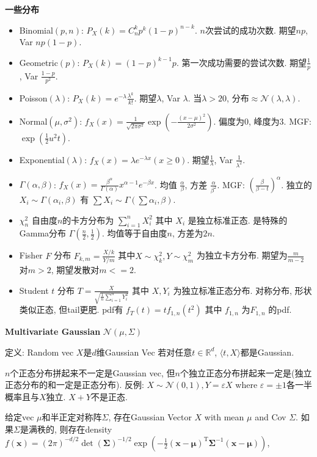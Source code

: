 \documentclass[UTF8]{ctexart}
\begin{document}
\noindent \textbf{一些分布}
\begin{itemize}
\item Binomial$(p, n)$: $P_X(k)=C_n^k p^k (1-p)^{n-k}$. $n$次尝试的成功次数. 期望$np$, Var $np(1-p)$.
\item Geometric$(p)$: $P_X(k)=(1-p)^{k-1}p$. 第一次成功需要的尝试次数. 期望$\frac{1}{p}$, Var $\frac{1-p}{p^2}$.
\item Poisson$(\lambda)$: $P_X(k)=e^{-\lambda}\frac{\lambda^k}{k!}$. 期望$\lambda$, Var $\lambda$.
	当$\lambda >20$, 分布$\approx\mathcal{N}(\lambda, \lambda)$.
\item Normal$(\mu, \sigma^2)$: $f_X(x)=\frac{1}{\sqrt{2\pi\sigma^2}}\exp(-\frac{(x-\mu)^2}{2\sigma^2})$. 
	偏度为0, 峰度为3. MGF: $\exp (\frac12 u^2 t)$.
\item Exponential$(\lambda)$: $f_X(x) = \lambda e^{-\lambda x}(x\geq 0)$. 期望$\frac{1}{\lambda}$, Var $\frac{1}{\lambda^2}$.
\item $\Gamma(\alpha, \beta)$: $f_X(x)=\frac{\beta^{\alpha}}{\Gamma(\alpha)}x^{\alpha-1}e^{-\beta x}$.
	均值 $\frac{\alpha}{\beta}$, 方差 $\frac{\alpha}{\beta^2}$. MGF: $(\frac{\beta}{\beta -t})^{\alpha}$.
	独立的 $X_i\sim \Gamma(\alpha_i,\beta)$ 有 $\sum  X_i \sim \Gamma(\sum \alpha_i, \beta)$.
\item $\chi_n^2$ 自由度$n$的卡方分布为 $\sum_{i=1}^n X_i^2$ 其中 $X_i$ 是独立标准正态. 是特殊的Gamma分布 $\Gamma(\frac{n}{2}, \frac12)$. 
	均值等于自由度$n$, 方差为$2n$.
\item Fisher $F$ 分布 $F_{k,m} = \frac{X/k}{Y/m}$ 其中$X\sim\chi_k^2, Y\sim\chi_m^2$ 为独立卡方分布.
	期望为$\frac{m}{m-2}$对$m>2$, 期望发散对$m<=2$.
\item Student $t$ 分布 $T = \frac{X}{\sqrt{\frac{1}{n}\sum_{i=1}^n Y_i^2}}$ 其中 $X, Y_i$ 为独立标准正态分布.
	对称分布, 形状类似正态, 但tail更肥. pdf有 $f_T(t)=tf_{1,n}(t^2)$ 其中 $f_{1,n}$ 为$F_{1,n}$ 的pdf.

\end{itemize}

\noindent \textbf{Multivariate Gaussian} $\mathcal{N}(\mu,\Sigma)$

定义: Random vec $X$是$d$维Gaussian Vec 若对任意$t\in\mathbb{R}^d$, $\langle t,X \rangle $都是Gaussian.

$n$个正态分布拼起来不一定是Gaussian vec, 但$n$个独立正态分布拼起来一定是(独立正态分布的和一定是正态分布).
反例: $X\sim\mathcal{N}(0,1), Y=\varepsilon X$ where $\varepsilon=\pm 1$各一半概率且与$X$独立. $X+Y$不是正态. 

给定vec $\mu$和半正定对称阵$\Sigma$, 存在Gaussian Vector $X$ with mean $\mu$ and Cov $\Sigma$.
如果$\Sigma$是满秩的, 则存在density
$f(\mathbf{x}) = (2 \pi)^{-d / 2} \operatorname{det}(\boldsymbol{\Sigma})^{-1 / 2} 
\exp \left(-\frac{1}{2}(\mathbf{x}-\boldsymbol{\mu})^{\mathrm{T}} \boldsymbol{\Sigma}^{-1}(\mathbf{x}-\boldsymbol{\mu})\right)$,
\end{document}
